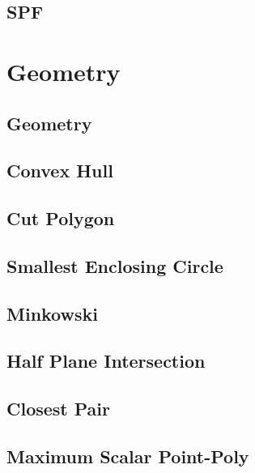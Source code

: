 \subsection{SPF}
\raggedbottom
\hrulefill

\section{Geometry}
\subsection{Geometry}
\raggedbottom
\hrulefill
\subsection{Convex Hull}
\raggedbottom
\hrulefill
\subsection{Cut Polygon}
\raggedbottom
\hrulefill
\subsection{Smallest Enclosing Circle}
\raggedbottom
\hrulefill
\subsection{Minkowski}
\raggedbottom
\hrulefill
\subsection{Half Plane Intersection}
\raggedbottom
\hrulefill
\subsection{Closest Pair}
\raggedbottom
\hrulefill
\subsection{Maximum Scalar Point-Poly}
\raggedbottom
\hrulefill

